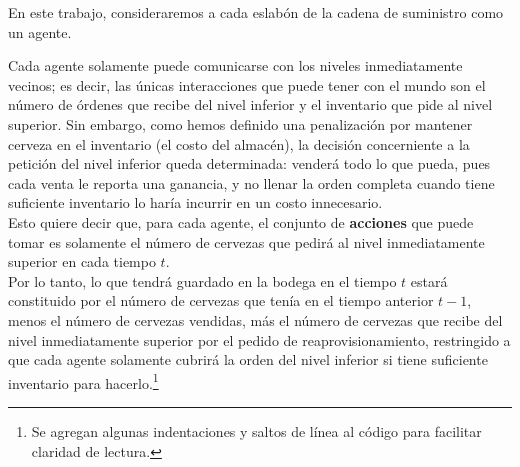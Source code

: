 

En este trabajo, consideraremos a cada eslab\'on de la cadena de suministro como un agente. 

Cada agente solamente puede comunicarse con los niveles inmediatamente vecinos; es decir, las \'unicas interacciones que puede tener con el mundo son el n\'umero de \'ordenes que recibe del nivel inferior y el inventario que pide al nivel superior. Sin embargo, como hemos definido una penalizaci\'on por mantener cerveza en el inventario (el costo del almac\'en), la decisi\'on concerniente a la petici\'on del nivel inferior queda determinada: vender\'a todo lo que pueda, pues cada venta le reporta una ganancia, y no llenar la orden completa cuando tiene suficiente inventario lo har\'ia incurrir en un costo innecesario.\\

Esto quiere decir que, para cada agente, el conjunto de \textbf{acciones} que puede tomar es solamente el n\'umero de cervezas que pedir\'a al nivel inmediatamente superior en cada tiempo $t$. \\

Por lo tanto, lo que tendr\'a guardado en la bodega en el tiempo $t$ estar\'a constituido por el n\'umero de cervezas que ten\'ia en el tiempo anterior $t-1$, menos el n\'umero de cervezas vendidas, m\'as el n\'umero de cervezas que recibe del nivel inmediatamente superior por el pedido de reaprovisionamiento, restringido a que cada agente solamente cubrir\'a la orden del nivel inferior si tiene suficiente inventario para hacerlo.\footnote{Se agregan algunas indentaciones y saltos de l\'inea al c\'odigo para facilitar claridad de lectura.}\\

